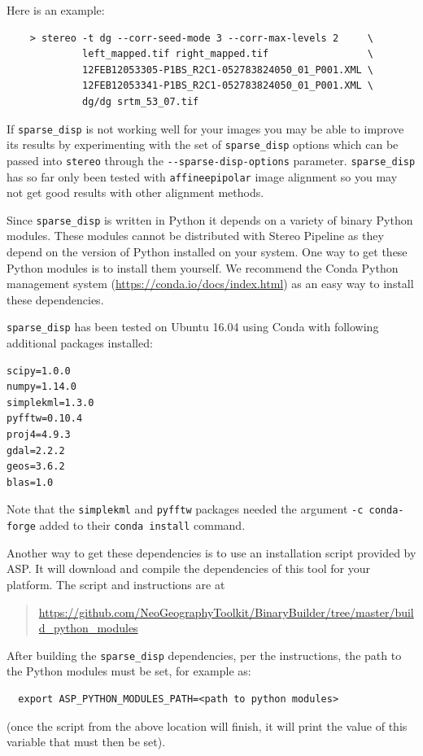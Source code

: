 Here is an example:

\begin{verbatim}
    > stereo -t dg --corr-seed-mode 3 --corr-max-levels 2     \
             left_mapped.tif right_mapped.tif                 \
             12FEB12053305-P1BS_R2C1-052783824050_01_P001.XML \
             12FEB12053341-P1BS_R2C1-052783824050_01_P001.XML \
             dg/dg srtm_53_07.tif
\end{verbatim}

If \texttt{sparse\_disp} is not working well for your images you may be
able to improve its results by experimenting with the set of \texttt{sparse\_disp}
options which can be passed into \texttt{stereo} through the 
\texttt{-\/-sparse-disp-options} parameter.  \texttt{sparse\_disp}
has so far only been tested with \texttt{affineepipolar} image alignment
so you may not get good results with other alignment methods.


Since \texttt{sparse\_disp} is written in Python
it depends on a variety of binary Python modules. These modules cannot
be distributed with Stereo Pipeline as they depend on the version of
Python installed on your system. One way to get these Python modules is
to install them yourself. We recommend the Conda Python management system
(\href{https://conda.io/docs/index.html}{https://conda.io/docs/index.html})
as an easy way to install these dependencies.

\texttt{sparse\_disp} has been tested on Ubuntu 16.04 using Conda with
following additional packages installed:
\begin{verbatim}
scipy=1.0.0
numpy=1.14.0
simplekml=1.3.0
pyfftw=0.10.4
proj4=4.9.3
gdal=2.2.2
geos=3.6.2
blas=1.0
\end{verbatim}
Note that the \texttt{simplekml} and \texttt{pyfftw} packages needed the argument
\texttt{-c conda-forge} added to their \texttt{conda install} command.

Another way to get these dependencies is to use an installation script
provided by ASP.  It will download and compile the dependencies of
this tool for your platform. The script and instructions are at

\begin{quote}
\indent \href{https://github.com/NeoGeographyToolkit/BinaryBuilder/tree/master/build\_python\_modules}{https://github.com/NeoGeographyToolkit/BinaryBuilder/tree/master/build\_python\_modules}
\end{quote}

After building the \texttt{sparse\_disp} dependencies, per the instructions, the path
to the Python modules must be set, for example as:
\begin{verbatim}
  export ASP_PYTHON_MODULES_PATH=<path to python modules>
\end{verbatim}
(once the script from the above location will finish, it will print the value
of this variable that must then be set).

